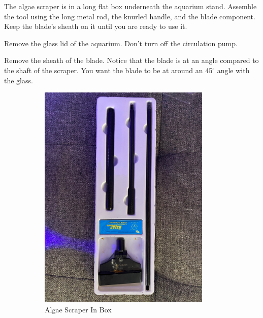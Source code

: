 \documentclass{report}
\begin{document}
The algae scraper is in a long flat box underneath the aquarium stand. Assemble the tool using the long metal rod, the knurled handle, and the blade component. Keep the blade's sheath on it until you are ready to use it.

Remove the glass lid of the aquarium. Don't turn off the circulation pump. 

Remove the sheath of the blade. Notice that the blade is at an angle compared to the shaft of the scraper. You want the blade to be at 
around an 45$^{\circ}$ angle with the glass. 

\begin{figure}[H]
    \centering
    \begin{subfigure}{0.5\textwidth}
        \centering
        \includegraphics[width=0.9\textwidth]{ScraperBox.jpg}
        \caption{Algae Scraper In Box}
    \end{subfigure}%
    \begin{subfigure}{0.5\textwidth}
        \centering

\end{subfigure}
\end{figure}
\end{document}

